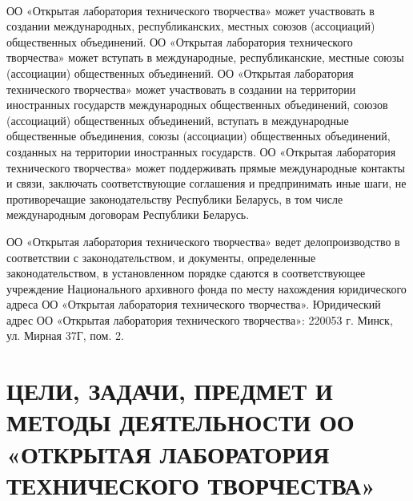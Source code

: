 \documentclass[a4paper,fontsize=14pt,titlepage]{scrartcl}
\makeatletter
\newenvironment{numberedpars}{%
  \addtocounter{secnumdepth}{1}
  \renewcommand\theparagraph{\arabic{section}.\arabic{paragraph}}
  \renewcommand\@seccntformat[1]
  {\expandafter\ifx\csname##1\endcsname\paragraph\csname 
  the##1\endcsname\else\csname the##1\endcsname\quad\fi}
  \let\old@par=\par
  \def\new@par{\let\par=\old@par\paragraph{}\let\par=\new@par}
  \let\par=\new@par
  \par
}{
  \addtocounter{secnumdepth}{-1}
}
\let\@@@section=\section
\renewcommand\section[1]{\@@@section{\MakeUppercase{#1}}}
\makeatother
\begin{document}
\begin{numberedpars}
 ОО «Открытая лаборатория технического творчества» может участвовать в создании международных, республиканских, местных
союзов (ассоциаций) общественных объединений. ОО «Открытая лаборатория технического творчества» может вступать в
международные, республиканские, местные союзы (ассоциации) общественных объединений. ОО «Открытая лаборатория
технического творчества» может участвовать в создании на территории иностранных государств международных общественных
объединений, союзов (ассоциаций) общественных объединений, вступать в международные общественные объединения, союзы
(ассоциации) общественных объединений, созданных на территории иностранных государств. ОО «Открытая лаборатория
технического творчества» может поддерживать прямые международные контакты и связи, заключать соответствующие соглашения
и предпринимать иные шаги, не противоречащие законодательству Республики Беларусь, в том числе международным договорам
Республики Беларусь.

ОО «Открытая лаборатория технического творчества» ведет делопроизводство в соответствии с законодательством, и
документы, определенные законодательством, в установленном порядке сдаются в соответствующее учреждение Национального
архивного фонда по месту нахождения юридического адреса ОО «Открытая лаборатория технического творчества».
Юридический адрес ОО «Открытая лаборатория технического творчества»: 220053 г. Минск, ул. Мирная 37Г, пом. 2.

\end{numberedpars}

\section{Цели, задачи, предмет и методы деятельности ОО «Открытая лаборатория технического творчества»}
\end{document}
